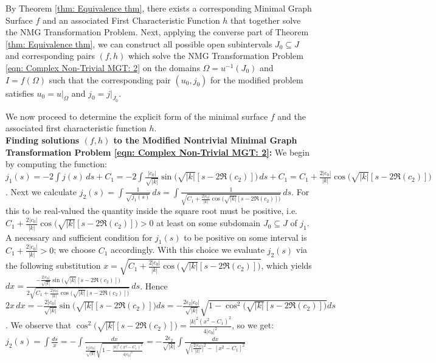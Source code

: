 \documentclass[12pt]{article}
\theoremstyle{plain}
\theoremstyle{definition}
\theoremstyle{remark}
\begin{document}
  By Theorem \ref{thm: Equivalence thm}, there exists a corresponding Minimal Graph Surface $f$ and an associated First Characteristic Function $h$ that together solve the NMG Transformation Problem. Next, applying the converse part of Theorem \ref{thm: Equivalence thm}, we can construct all possible open subintervals $J_0 \subseteq J$ and corresponding pairs $(f, h)$ which solve the NMG Transformation Problem \ref{eqn: Complex Non-Trivial MGT: 2} on the domains $\Omega = u^{-1}(J_0)$ and $I = f(\Omega)$ such that the corresponding pair $(u_0, j_0)$ for the modified problem satisfies $u_0 = u|_{\Omega}$ and $j_0 = j|_{J_0}$.
  
  We now proceed to determine the explicit form of the minimal surface $f$ and the associated first characteristic function $h$.\\
  
  \textbf{Finding solutions \((f,h)\) to the Modified Nontrivial Minimal Graph Transformation Problem \ref{eqn: Complex Non-Trivial MGT: 2}:} We begin by computing the function: \(j_1(s) = -2\int j(s)\,ds + C_1 = -2\int \tfrac{|c_0|}{\sqrt{|k|}}\sin\big(\sqrt{|k|}[s-2\Re(c_2)]\big)\,ds + C_1 = C_1 + \tfrac{2|c_0|}{|k|}\cos\big(\sqrt{|k|}[s-2\Re(c_2)]\big)\). Next we calculate \footnotesize\(j_2(s) = \int \tfrac{1}{\sqrt{j_1(s)}}\,ds = \int \tfrac{1}{\sqrt{C_1 + \tfrac{2|c_0|}{|k|}\cos\big(\sqrt{|k|}[s-2\Re(c_2)]\big)}}\,ds\)\normalsize. For this to be real‑valued the quantity inside the square root must be positive, i.e. \(C_1 + \tfrac{2|c_0|}{|k|}\cos\big(\sqrt{|k|}[s-2\Re(c_2)]\big) > 0\) at least on some subdomain \(J_0\subseteq J\) of \(j_1\). A necessary and sufficient condition for \(j_1(s)\) to be positive on some interval is \(C_1 + \tfrac{2|c_0|}{|k|} > 0\); we choose \(C_1\) accordingly. With this choice we evaluate \(j_2(s)\) via the following substitution \footnotesize\(x = \sqrt{C_1 + \tfrac{2|c_0|}{|k|}\cos\big(\sqrt{|k|}[s-2\Re(c_2)]\big)}\)\normalsize, which yields \footnotesize\(dx = \tfrac{-\frac{2|c_0|}{\sqrt{|k|}}\sin\big(\sqrt{|k|}[s-2\Re(c_2)]\big)}{2\sqrt{C_1 + \frac{2|c_0|}{|k|}\cos\big(\sqrt{|k|}[s-2\Re(c_2)]\big)}}\,ds\)\normalsize. Hence \footnotesize\(2x\,dx = -\tfrac{2|c_0|}{\sqrt{|k|}}\sin\big(\sqrt{|k|}[s-2\Re(c_2)]\big)ds = -\frac{2\epsilon_2|c_0|}{\sqrt{|k|}}\sqrt{1-\cos^2\big(\sqrt{|k|}[s-2\Re(c_2)]\big)}ds\)\normalsize. We observe that \(\cos^2\big(\sqrt{|k|}[s-2\Re(c_2)]\big)=\tfrac{|k|^2(x^2-C_1)^2}{4|c_0|^2}\), so we get:   
  \(
    j_2(s)=\int \frac{ds}{x}=- \int \tfrac{dx}{\frac{\epsilon_2|c_0|}{\sqrt{|k|}}\sqrt{1-\frac{|k|^2(x^2-C_1)^2}{4|c_0|^2}}}=-\tfrac{2\epsilon_2}{\sqrt{|k|}} \int \tfrac{dx}{\sqrt{\big[\frac{2|c_0|}{|k|}\big]^2-\,[x^2-C_1]^2}}
  \)
  
\end{document}
